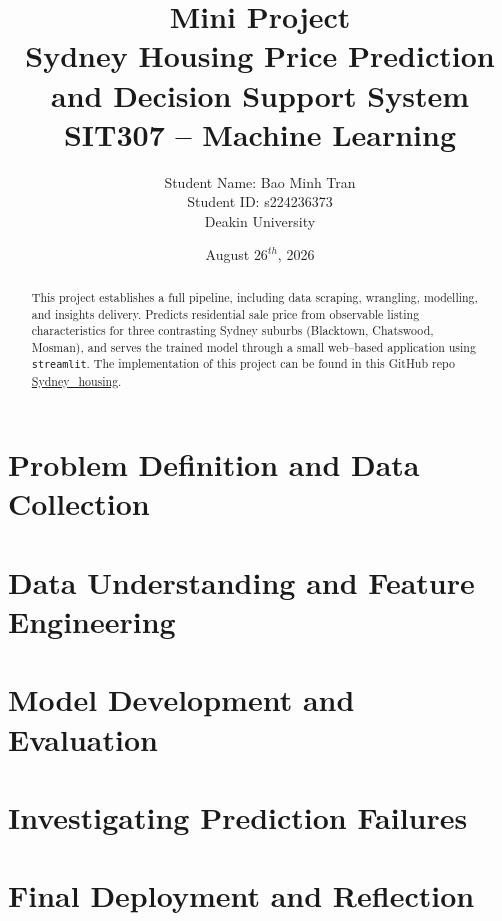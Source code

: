 \documentclass[11pt,a4paper]{article}
\title{\textbf{Mini Project \\ Sydney Housing Price Prediction and Decision Support System}\\[6pt]
       \large {SIT307 -- Machine Learning}}
\author{Student Name: Bao Minh Tran \\
 Student ID: s224236373 \\
  Deakin University}
\date{August $26^{th}$, 2026}
\theoremstyle{definition}
\theoremstyle{remark}
\begin{document}


\begin{abstract}
    \noindent
    This project establishes a full pipeline, including data scraping, wrangling, modelling, and insights delivery.
    Predicts residential sale price from observable listing characteristics for three contrasting Sydney suburbs (Blacktown, Chatswood, Mosman), and serves the trained model through a small web–based application using \texttt{streamlit}.
    The implementation of this project can be found in this GitHub repo \href{https://github.com/Trminh06-work/Sydney_housing.git}{Sydney\_housing}.
\end{abstract}

\setcounter{tocdepth}{2}
\tableofcontents
\newpage

\section{Problem Definition and Data Collection}




\newpage
\section{Data Understanding and Feature Engineering}



\newpage
\section{Model Development and Evaluation}



\section{Investigating Prediction Failures}



\section{Final Deployment and Reflection}



\newpage

\nocite{*}
\end{document}

